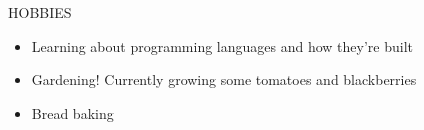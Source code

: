 \documentclass{resume}
\begin{document}
\begin{rSection}{HOBBIES}
	\begin{itemize}
		\setlength{\itemsep}{-3pt}
		\item Learning about programming languages and how they're built
		\item Gardening! Currently growing some tomatoes and blackberries
		\item Bread baking
	\end{itemize}
\end{rSection}
\end{document}
